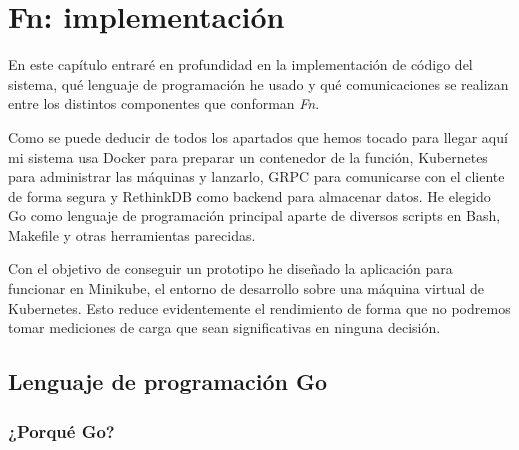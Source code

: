 \chapter{Fn: implementación}
\label{chap:fn-implementacion}

En este capítulo entraré en profundidad en la implementación de código del sistema, qué lenguaje de programación he usado y qué comunicaciones se realizan entre los distintos componentes que conforman \emph{Fn}.

Como se puede deducir de todos los apartados que hemos tocado para llegar aquí mi sistema usa Docker para preparar un contenedor de la función, Kubernetes para administrar las máquinas y lanzarlo, GRPC para comunicarse con el cliente de forma segura y RethinkDB como backend para almacenar datos. He elegido Go como lenguaje de programación principal aparte de diversos scripts en Bash, Makefile y otras herramientas parecidas.

Con el objetivo de conseguir un prototipo he diseñado la aplicación para funcionar en Minikube, el entorno de desarrollo sobre una máquina virtual de Kubernetes. Esto reduce evidentemente el rendimiento de forma que no podremos tomar mediciones de carga que sean significativas en ninguna decisión.

\section{Lenguaje de programación Go}

\subsection{¿Porqué Go?}

